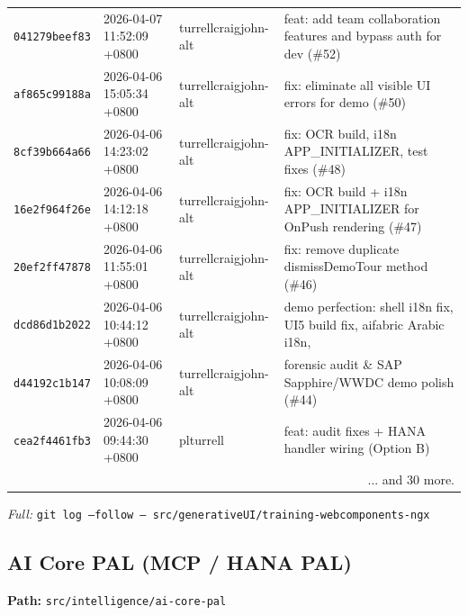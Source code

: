 \documentclass[11pt,a4paper]{article}
\begin{document}
\begin{longtable}{|p{2.2cm}|p{3.2cm}|l|p{6cm}|}
\texttt{041279beef83} & 2026-04-07 11:52:09 +0800 & turrellcraigjohn-alt & feat: add team collaboration features and bypass auth for dev (\#52) \\
\texttt{af865c99188a} & 2026-04-06 15:05:34 +0800 & turrellcraigjohn-alt & fix: eliminate all visible UI errors for demo (\#50) \\
\texttt{8cf39b664a66} & 2026-04-06 14:23:02 +0800 & turrellcraigjohn-alt & fix: OCR build, i18n APP\_INITIALIZER, test fixes (\#48) \\
\texttt{16e2f964f26e} & 2026-04-06 14:12:18 +0800 & turrellcraigjohn-alt & fix: OCR build + i18n APP\_INITIALIZER for OnPush rendering (\#47) \\
\texttt{20ef2ff47878} & 2026-04-06 11:55:01 +0800 & turrellcraigjohn-alt & fix: remove duplicate dismissDemoTour method (\#46) \\
\texttt{dcd86d1b2022} & 2026-04-06 10:44:12 +0800 & turrellcraigjohn-alt & demo perfection: shell i18n fix, UI5 build fix, aifabric Arabic i18n,  \\
\texttt{d44192c1b147} & 2026-04-06 10:08:09 +0800 & turrellcraigjohn-alt & forensic audit \& SAP Sapphire/WWDC demo polish (\#44) \\
\texttt{cea2f4461fb3} & 2026-04-06 09:44:30 +0800 & plturrell & feat: audit fixes + HANA handler wiring (Option B) \\
\hline
\multicolumn{4}{r}{... and 30 more.} \\ \hline
\end{longtable}
\textit{Full:} \texttt{git log --follow -- src/generativeUI/training-webcomponents-ngx}

\subsection{AI Core PAL (MCP / HANA PAL)}
\textbf{Path:} \texttt{src/intelligence/ai-core-pal}
\end{document}
